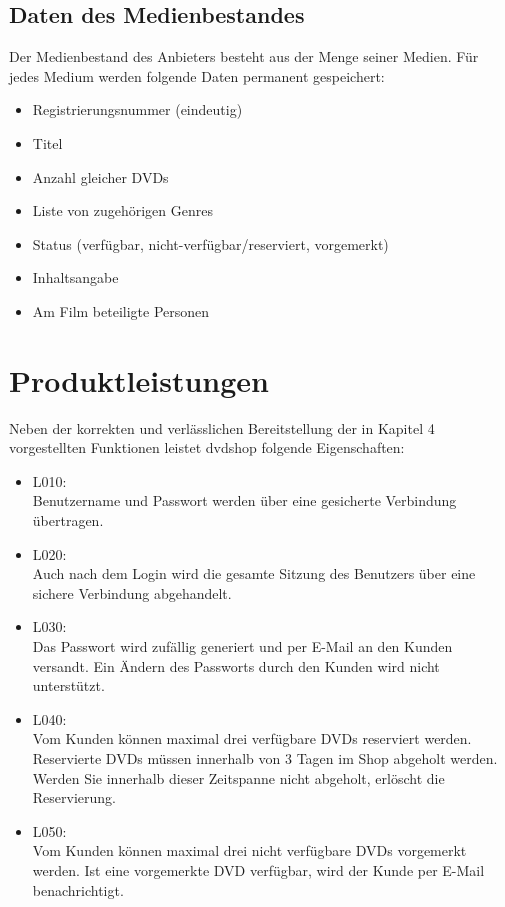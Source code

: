 \documentclass[12pt,oneside,a4paper,bibtotoc,liststotoc,pointlessnumbers]{scrartcl}
\begin{document}
\subsection{Daten des Medienbestandes}
Der Medienbestand des Anbieters besteht aus der Menge seiner Medien. Für jedes Medium werden folgende Daten permanent gespeichert:
\begin{itemize}
\item Registrierungsnummer (eindeutig)
\item Titel
\item Anzahl gleicher DVDs
\item Liste von zugehörigen Genres
\item Status (verfügbar, nicht-verfügbar/reserviert, vorgemerkt)
\item Inhaltsangabe
\item Am Film beteiligte Personen
\end{itemize}

\newpage
\section{Produktleistungen}
Neben der korrekten und verlässlichen Bereitstellung der in Kapitel 4 vorgestellten Funktionen leistet dvdshop folgende Eigenschaften:
\begin{itemize}
\item L010: \\Benutzername und Passwort werden über eine gesicherte Verbindung übertragen.
\item L020: \\Auch nach dem Login wird die gesamte Sitzung des Benutzers über eine sichere Verbindung abgehandelt.
\item L030: \\Das Passwort wird zufällig generiert und per E-Mail an den Kunden versandt. Ein Ändern des Passworts durch den Kunden wird nicht unterstützt.
\item L040: \\Vom Kunden können maximal drei verfügbare DVDs reserviert werden. Reservierte DVDs
müssen innerhalb von 3 Tagen im Shop abgeholt werden. Werden Sie innerhalb dieser Zeitspanne nicht abgeholt, erlöscht die Reservierung.
\item L050: \\Vom Kunden können maximal drei nicht verfügbare DVDs vorgemerkt werden. Ist eine
vorgemerkte DVD verfügbar, wird der Kunde per E-Mail benachrichtigt.
\end{itemize}
\end{document}
